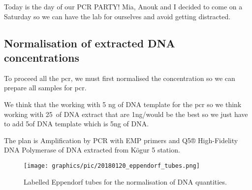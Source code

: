 
Today is the day of our PCR PARTY! Mia, Anouk and I decided to come on a Saturday so we can have the lab for ourselves and avoid getting distracted.

\subsection{Normalisation of extracted DNA concentrations}
\label{task:20180120_cj0}

To proceed all the \gls{pcr}, we must first normalised the concentration so we can prepare all samples for \gls{pcr}. 

We think that the working with 5 ng of DNA template for the \gls{pcr} so we think working with 25~\uL of DNA extract that are 1ng/\uL would be the best so we just have to add 5\uL of DNA template which is 5ng of DNA.

The plan is Amplification by PCR with EMP primers and Q5® High-Fidelity DNA Polymerase of DNA extracted from Kögur 5 station.

\begin{figure}[H] %
    \centering
    \caption{Labelled Eppendorf tubes for the normalisation of DNA quantities.}
    \label{fig:20180120_eppendorf_tubes}
    \texttt{[image: graphics/pic/20180120\_eppendorf\_tubes.png]}
\end{figure}
